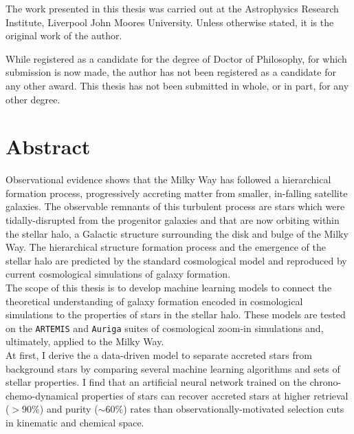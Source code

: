 \documentclass[a4paper,12pt,oneside]{report}
\begin{document}
\vspace{1.5cm}

The work presented in this thesis was carried out at the Astrophysics Research
Institute, Liverpool John Moores University. 
Unless otherwise stated, it is the original work of the author.

While registered as a candidate for the degree of Doctor of Philosophy, for which
submission is now made, the author has not been registered as a candidate for any
other award. This thesis has not been submitted in whole, or in part, for any
other degree.

\vspace{2.5cm}


\chapter*{Abstract}

Observational evidence shows that the Milky Way has followed a hierarchical formation process,
progressively accreting matter from smaller, in-falling satellite galaxies. The observable remnants of
this turbulent process are stars which were tidally-disrupted from the progenitor galaxies and that
are now orbiting within the stellar halo, a Galactic structure surrounding the disk and bulge of the Milky Way. 
The hierarchical structure formation process and the emergence of the stellar halo are predicted by
the standard cosmological model and reproduced by current cosmological simulations of galaxy formation. \\

The scope of this thesis is to develop machine learning models to connect the theoretical understanding of 
galaxy formation encoded in cosmological simulations to the properties of stars 
in the stellar halo. These models are tested on the \texttt{ARTEMIS} and \texttt{Auriga} suites of
cosmological zoom-in simulations and, ultimately, applied to the Milky Way. \\

At first, I derive the a data-driven model to separate accreted stars from background stars by 
comparing several machine learning algorithms and sets of stellar properties. I find that an artificial neural
network trained on the chrono-chemo-dynamical properties of stars can recover accreted stars at 
higher retrieval ($>90\%$) and purity ($\sim60\%$) rates than observationally-motivated selection cuts in kinematic and 
chemical space.   \\
\end{document}
